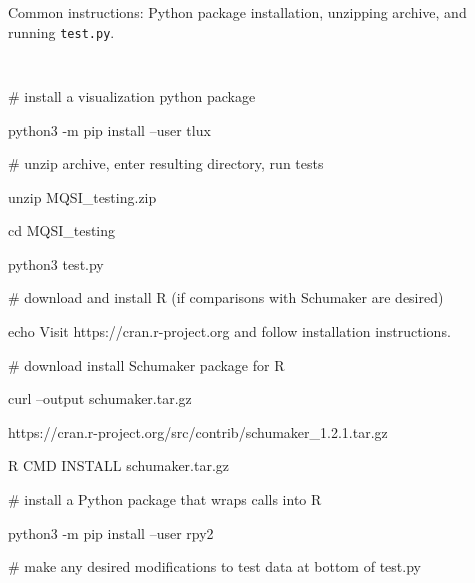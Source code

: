 \vskip 3mm

Common instructions: Python package installation, unzipping archive, and running {\hskip 1mm} {\tt test.py}.

{\parskip=2pt \parindent=20pt \tt
\item{} \textMaroon \# install a visualization python package \textBlack
\item{} python3 -m pip install --user tlux
\item{}
\item{} \textMaroon \# unzip archive, enter resulting directory, run tests \textBlack
\item{} unzip MQSI\_testing.zip
\item{} cd MQSI\_testing
\item{} python3 test.py
\item{}
\item{} \textMaroon \# download and install R (if comparisons with Schumaker are desired) \textBlack
\item{} echo {}Visit https://cran.r-project.org and follow installation instructions.{}
\item{} \textMaroon \# download install Schumaker package for R \textBlack
\item{} curl --output schumaker.tar.gz $ $
\item{} \hskip 10mm https://cran.r-project.org/src/contrib/schumaker\_1.2.1.tar.gz
\item{} R CMD INSTALL schumaker.tar.gz
\item{} \textMaroon \# install a Python package that wraps calls into R \textBlack
\item{} python3 -m pip install --user rpy2
\item{}
\item{} \textMaroon \# make any desired modifications to test data at bottom of \textBlack test.py 
}

\bye


